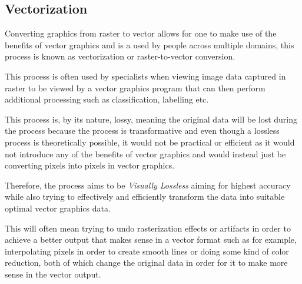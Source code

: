 \documentclass[12pt]{article}
\newcommand{\sentence}{} %
\newcommand{\italic}[1]{\textit{#1}}
\begin{document}

    \subsection{Vectorization}\label{subsec:vectorization}

    \tab
    Converting graphics from raster to vector allows for one to make use of the benefits of vector graphics and is a
    used by people across multiple domains, this process is known as vectorization or raster-to-vector conversion.
    \sentence
    This process is often used by specialists when viewing image data captured in raster to be viewed by a vector
    graphics program that can then perform additional processing such as classification, labelling etc.
    \sentence
    This process is, by its nature, lossy, meaning the original data will be lost during the process because the
    process is transformative and even though a lossless process is theoretically possible, it would not be practical
    or efficient as it would not introduce any of the benefits of vector graphics and would instead just be
    converting pixels into pixels in vector graphics.
    \sentence
    Therefore, the process aims to be \italic{Visually Lossless} aiming for highest accuracy while also trying to
    effectively and efficiently transform the data into suitable optimal vector graphics data.
    \sentence
    This will often mean trying to undo rasterization effects or artifacts in order to achieve a better output that
    makes sense in a vector format such as for example, interpolating pixels in order to create smooth lines
    or doing some kind of color reduction, both of which change the original data in order for it to make more sense
    in the vector output.
\end{document}
